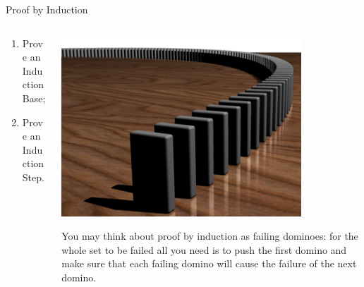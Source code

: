 \documentclass[9pt,aspectratio=169,handout]{beamer}
\begin{document}
\begin{frame}{Proof by Induction}
\begin{columns}[T]
\begin{column}{0.5\textwidth}
      \begin{enumerate}
        \item Prove an Induction Base;
        \item Prove an Induction Step.
      \end{enumerate}\pause
    \end{column}
    \begin{column}{0.5\textwidth}
      \begin{center}
        \vspace*{-\intextsep}
        \includegraphics[width=0.8\textwidth]{20 - Induction/Dominoeffect.png}
      \end{center}
      You may think about proof by induction as failing dominoes: for the whole set to be failed all you need is to push the first domino and make sure that each failing domino will cause the failure of the next domino. 
    \end{column}
  \end{columns}
\end{frame}
\end{document}
